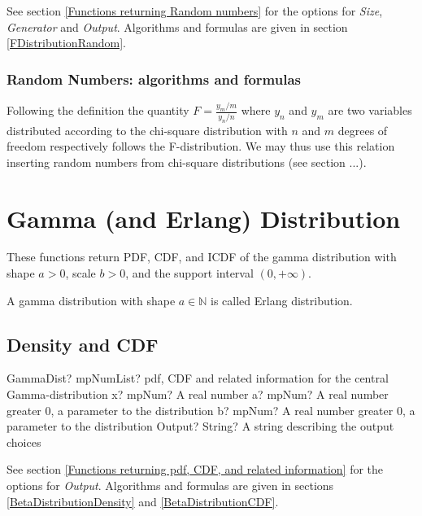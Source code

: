 \vspace{0.3cm}

See section \ref{Functions returning Random numbers} for the options for  {\itshape\sffamily Size},  {\itshape\sffamily Generator} and {\itshape\sffamily Output}. Algorithms and formulas are given in section \ref{FDistributionRandom}.


\subsubsection{Random Numbers: algorithms and formulas}

Following the definition the quantity $F = \frac{y_m/m}{y_n/n}$ where $y_n$ and $y_m$ are two variables distributed according to the chi-square distribution with
$n$ and $m$ degrees of freedom respectively follows the F-distribution. We may thus use this relation inserting random numbers from chi-square distributions (see section ...).




\newpage
\section{Gamma (and Erlang) Distribution}
\label{GammaDistribution}

These functions return PDF, CDF, and ICDF of the gamma distribution with shape
$a > 0$, scale $b > 0$, and the support interval $(0,+\infty)$.

A gamma distribution with shape $a \in \mathbb{N}$ is called Erlang distribution.

\subsection{Density and CDF}

\begin{mpFunctionsExtract}
	\mpFunctionFourNotImplemented
	{GammaDist? mpNumList? pdf, CDF and related information for the central Gamma-distribution}
	{x? mpNum? A real number}
	{a? mpNum? A real number greater 0, a parameter to the distribution}
	{b? mpNum? A real number greater 0, a parameter to the distribution}
	{Output? String? A string describing the output choices}
\end{mpFunctionsExtract}


\vspace{0.3cm}
See section \ref{Functions returning pdf, CDF, and related information} for the options for {\itshape\sffamily Output}. Algorithms and formulas are given in sections \ref{BetaDistributionDensity} and \ref{BetaDistributionCDF}.


